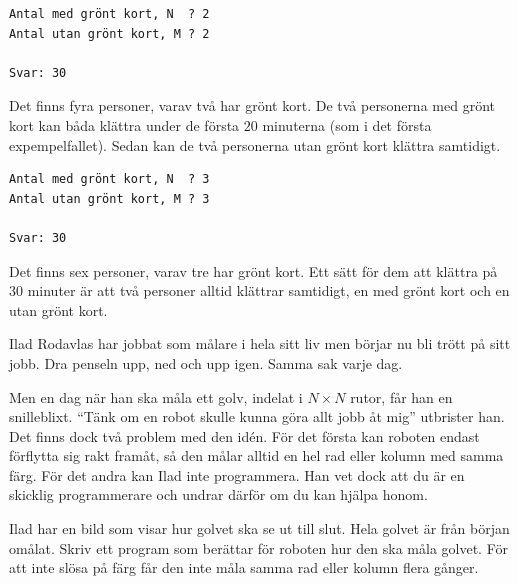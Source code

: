 \begin{verbatim}
Antal med grönt kort, N  ? 2
Antal utan grönt kort, M ? 2

Svar: 30
\end{verbatim}

 Det finns fyra personer, varav två har grönt kort.
De två personerna med grönt kort kan båda klättra under de första $20$ minuterna (som i det första expempelfallet).
Sedan kan de två personerna utan grönt kort klättra samtidigt.

\vspace{0.5cm}

\begin{verbatim}
Antal med grönt kort, N  ? 3
Antal utan grönt kort, M ? 3

Svar: 30
\end{verbatim}

 Det finns sex personer, varav tre har grönt kort.
Ett sätt för dem att klättra på $30$ minuter är att två personer alltid klättrar samtidigt, en med grönt kort och en utan grönt kort.


\newpage
{}

Ilad Rodavlas har jobbat som målare i hela sitt liv men börjar nu bli trött på sitt jobb.
Dra penseln upp, ned och upp igen.
Samma sak varje dag.

Men en dag när han ska måla ett golv, indelat i $N \times N$ rutor, får han en snilleblixt.
``Tänk om en robot skulle kunna göra allt jobb åt mig'' utbrister han.
Det finns dock två problem med den  idén.
För det första kan roboten endast förflytta sig rakt framåt, så den målar alltid en hel rad eller kolumn med samma färg.
För det andra kan Ilad inte programmera.
Han vet dock att du är en skicklig programmerare och undrar därför om du kan hjälpa honom. 

Ilad har en bild som visar hur golvet ska se ut till slut. Hela golvet är från början omålat.
Skriv ett program som berättar för roboten hur den ska måla golvet.
För att inte slösa på färg får den inte måla samma rad eller kolumn flera gånger.



